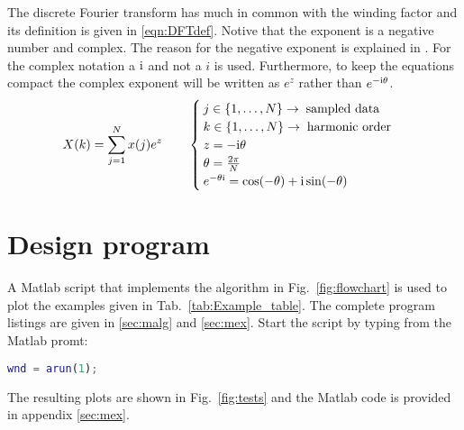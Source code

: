 The discrete Fourier transform has much in common with the winding factor and its definition is given in \eqref{eqn:DFTdef}. Notive that the exponent is a negative number and complex. The reason for the negative exponent is explained in \cite{REF-01048,REF-01049,REF-01050}. For the complex notation a ${\mathrm{i}}$ and not a $i$ is used. Furthermore, to keep the equations compact the complex exponent will be written as $e^z$ rather than $e^{-{\mathrm{i}}\theta}$.
\begin{equation}\label{eqn:DFTdef}
  X(k)=\sum_{j=1}^{N}x(j)e^z
  \qquad
  \begin{cases}
    j \in \left\{1,\ldots,N  \right\} \rightarrow \; \mbox{sampled data}\\
  	k \in \left\{1,\ldots,N  \right\} \rightarrow \; \mbox{harmonic order}\\
    z = -{\mathrm{i}}\theta   \\
  	\theta = \frac{2\pi}{N}   \\
  	e^{-\theta {\mathrm{i}}} = \cos (-\theta) + {\mathrm{i}} \sin (-\theta)
  \end{cases}
\end{equation}



\section{Design program}
A Matlab script that implements the algorithm in Fig.~\ref{fig:flowchart} is used to plot the examples given in Tab.~\ref{tab:Example_table}. The complete program listings are given in \ref{sec:malg} and \ref{sec:mex}. Start the script by typing from the Matlab promt:

\begin{lstlisting}[language=matlab]
wnd = arun(1);
\end{lstlisting}
The resulting plots are shown in Fig.~\ref{fig:tests} and the Matlab code is provided in appendix \ref{sec:mex}.

